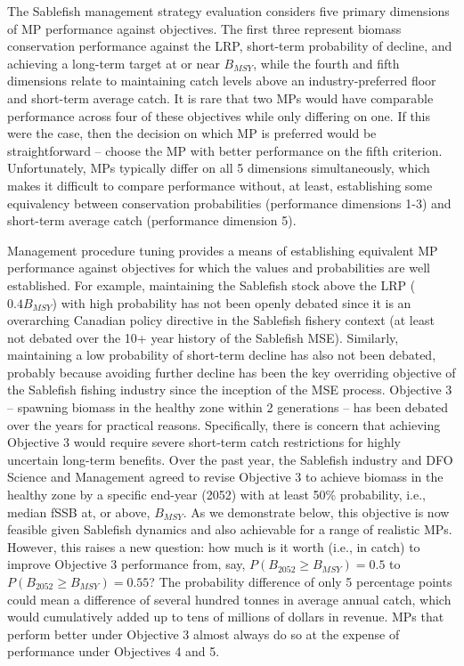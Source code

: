 \documentclass[11pt]{book}
\begin{document}
The Sablefish management strategy evaluation considers five primary dimensions of MP performance against objectives. The first three represent biomass conservation performance against the LRP, short-term probability of decline, and achieving a long-term target at or near \(B_{MSY}\), while the fourth and fifth dimensions relate to maintaining catch levels above an industry-preferred floor and short-term average catch. It is rare that two MPs would have comparable performance across four of these objectives while only differing on one. If this were the case, then the decision on which MP is preferred would be straightforward -- choose the MP with better performance on the fifth criterion. Unfortunately, MPs typically differ on all 5 dimensions simultaneously, which makes it difficult to compare performance without, at least, establishing some equivalency between conservation probabilities (performance dimensions 1-3) and short-term average catch (performance dimension 5).

Management procedure tuning provides a means of establishing equivalent MP performance against objectives for which the values and probabilities are well established. For example, maintaining the Sablefish stock above the LRP (\(0.4B_{MSY}\)) with high probability has not been openly debated since it is an overarching Canadian policy directive in the Sablefish fishery context (at least not debated over the 10+ year history of the Sablefish MSE). Similarly, maintaining a low probability of short-term decline has also not been debated, probably because avoiding further decline has been the key overriding objective of the Sablefish fishing industry since the inception of the MSE process. Objective 3 -- spawning biomass in the healthy zone within 2 generations -- has been debated over the years for practical reasons. Specifically, there is concern that achieving Objective 3 would require severe short-term catch restrictions for highly uncertain long-term benefits. Over the past year, the Sablefish industry and DFO Science and Management agreed to revise Objective 3 to achieve biomass in the healthy zone by a specific end-year (2052) with at least 50\% probability, i.e., median fSSB at, or above, \(B_{MSY}\). As we demonstrate below, this objective is now feasible given Sablefish dynamics and also achievable for a range of realistic MPs. However, this raises a new question: how much is it worth (i.e., in catch) to improve Objective 3 performance from, say, \(P(B_{2052} \geq B_{MSY}) = 0.5\) to \(P(B_{2052} \geq B_{MSY}) = 0.55\)? The probability difference of only 5 percentage points could mean a difference of several hundred tonnes in average annual catch, which would cumulatively added up to tens of millions of dollars in revenue. MPs that perform better under Objective 3 almost always do so at the expense of performance under Objectives 4 and 5.
\end{document}
